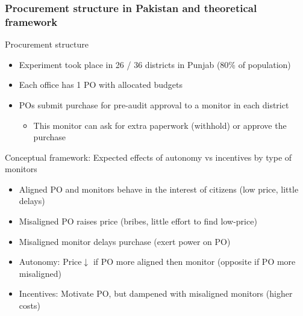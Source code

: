 \documentclass[aspectratio=169]{beamer}
\begin{document}
\begin{frame}
\frametitle{Procurement structure in Pakistan and theoretical framework} 
Procurement structure
\begin{itemize}\setlength\itemsep{3pt}
\item Experiment took place in 26 / 36 districts in Punjab (80\% of population)
\item Each office has 1 PO with allocated budgets
\item POs submit purchase for pre-audit approval to a monitor in each district
\begin{itemize}\setlength\itemsep{3pt}
\item This monitor can ask for extra paperwork (withhold) or approve the purchase
\end{itemize}
\end{itemize}\medskip
Conceptual framework: Expected effects of autonomy vs incentives by type of monitors
\begin{itemize}\setlength\itemsep{3pt}
\item Aligned PO and monitors behave in the interest of citizens (low price, little delays)
\item Misaligned PO raises price (bribes, little effort to find low-price)
\item Misaligned monitor delays purchase (exert power on PO)
\item Autonomy: Price$\downarrow$ if PO more aligned then monitor (opposite if PO more misaligned)
\item Incentives: Motivate PO, but dampened with misaligned monitors (higher costs)
\end{itemize}
\end{frame}
\end{document}
